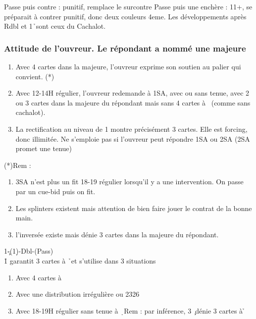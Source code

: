 \documentclass[a4paper]{article}
\begin{document}
Passe puis contre : punitif, remplace le surcontre
Passe puis une enchère : 11+, se préparait à contrer punitif, donc deux couleurs 4eme.
Les développements après Rdbl et 1\h\ sont ceux du Cachalot.

\subsubsection{Attitude de l’ouvreur. Le répondant a 
nommé une majeure}

\begin{enumerate}
\item Avec 4 cartes dans la majeure, l’ouvreur exprime son soutien 
au palier qui convient. (*)

\item Avec 12-14H régulier, l’ouvreur redemande à 1SA, avec ou 
sans tenue, avec 2 ou 3 cartes dans la majeure du répondant 
mais sans 4 cartes à \s\ (comme sans cachalot).

\item La rectification au niveau de 1 montre précisément 3 cartes. 
Elle est forcing, donc illimitée. Ne s’emploie pas si l’ouvreur 
peut répondre 1SA ou 2SA (2SA promet une tenue)

\end{enumerate}

(*)Rem :

\begin{enumerate}
\item 3SA n’est plus un fit 18-19 régulier lorsqu’il y a une intervention. On passe
par un cue-bid puis on fit.

\item Les splinters existent mais attention de bien faire jouer le contrat de la 
bonne main.

\item l’inversée existe mais dénie 3 cartes dans la majeure du répondant.

\end{enumerate}

\begin{bidtable}
1\c-(1\d)-Dbl-(Pass)\\
1\h \> garantit 3 cartes à \h\ et s’utilise dans 3 situations
\end{bidtable}

\begin{enumerate}
\item Avec 4 cartes à \s\ 

\item Avec une distribution irrégulière ou 2326

\item Avec 18-19H régulier sans tenue à \d\ 
Rem : par inférence, 3 \c\ dénie 3 cartes à \h 

\end{enumerate}
\end{document}
